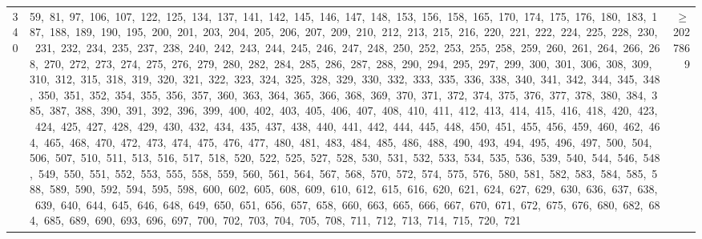\begin{longtable}{c|p{}|r}
340 & 59,\ 81,\ 97,\ 106,\ 107,\ 122,\ 125,\ 134,\ 137,\ 141,\ 142,\ 145,\ 146,\ 147,\ 148,\ 153,\ 156,\ 158,\ 165,\ 170,\ 174,\ 175,\ 176,\ 180,\ 183,\ 187,\ 188,\ 189,\ 190,\ 195,\ 200,\ 201,\ 203,\ 204,\ 205,\ 206,\ 207,\ 209,\ 210,\ 212,\ 213,\ 215,\ 216,\ 220,\ 221,\ 222,\ 224,\ 225,\ 228,\ 230,\ 231,\ 232,\ 234,\ 235,\ 237,\ 238,\ 240,\ 242,\ 243,\ 244,\ 245,\ 246,\ 247,\ 248,\ 250,\ 252,\ 253,\ 255,\ 258,\ 259,\ 260,\ 261,\ 264,\ 266,\ 268,\ 270,\ 272,\ 273,\ 274,\ 275,\ 276,\ 279,\ 280,\ 282,\ 284,\ 285,\ 286,\ 287,\ 288,\ 290,\ 294,\ 295,\ 297,\ 299,\ 300,\ 301,\ 306,\ 308,\ 309,\ 310,\ 312,\ 315,\ 318,\ 319,\ 320,\ 321,\ 322,\ 323,\ 324,\ 325,\ 328,\ 329,\ 330,\ 332,\ 333,\ 335,\ 336,\ 338,\ 340,\ 341,\ 342,\ 344,\ 345,\ 348,\ 350,\ 351,\ 352,\ 354,\ 355,\ 356,\ 357,\ 360,\ 363,\ 364,\ 365,\ 366,\ 368,\ 369,\ 370,\ 371,\ 372,\ 374,\ 375,\ 376,\ 377,\ 378,\ 380,\ 384,\ 385,\ 387,\ 388,\ 390,\ 391,\ 392,\ 396,\ 399,\ 400,\ 402,\ 403,\ 405,\ 406,\ 407,\ 408,\ 410,\ 411,\ 412,\ 413,\ 414,\ 415,\ 416,\ 418,\ 420,\ 423,\ 424,\ 425,\ 427,\ 428,\ 429,\ 430,\ 432,\ 434,\ 435,\ 437,\ 438,\ 440,\ 441,\ 442,\ 444,\ 445,\ 448,\ 450,\ 451,\ 455,\ 456,\ 459,\ 460,\ 462,\ 464,\ 465,\ 468,\ 470,\ 472,\ 473,\ 474,\ 475,\ 476,\ 477,\ 480,\ 481,\ 483,\ 484,\ 485,\ 486,\ 488,\ 490,\ 493,\ 494,\ 495,\ 496,\ 497,\ 500,\ 504,\ 506,\ 507,\ 510,\ 511,\ 513,\ 516,\ 517,\ 518,\ 520,\ 522,\ 525,\ 527,\ 528,\ 530,\ 531,\ 532,\ 533,\ 534,\ 535,\ 536,\ 539,\ 540,\ 544,\ 546,\ 548,\ 549,\ 550,\ 551,\ 552,\ 553,\ 555,\ 558,\ 559,\ 560,\ 561,\ 564,\ 567,\ 568,\ 570,\ 572,\ 574,\ 575,\ 576,\ 580,\ 581,\ 582,\ 583,\ 584,\ 585,\ 588,\ 589,\ 590,\ 592,\ 594,\ 595,\ 598,\ 600,\ 602,\ 605,\ 608,\ 609,\ 610,\ 612,\ 615,\ 616,\ 620,\ 621,\ 624,\ 627,\ 629,\ 630,\ 636,\ 637,\ 638,\ 639,\ 640,\ 644,\ 645,\ 646,\ 648,\ 649,\ 650,\ 651,\ 656,\ 657,\ 658,\ 660,\ 663,\ 665,\ 666,\ 667,\ 670,\ 671,\ 672,\ 675,\ 676,\ 680,\ 682,\ 684,\ 685,\ 689,\ 690,\ 693,\ 696,\ 697,\ 700,\ 702,\ 703,\ 704,\ 705,\ 708,\ 711,\ 712,\ 713,\ 714,\ 715,\ 720,\ 721 & $\ge$ 2027869 \\

\end{longtable}
